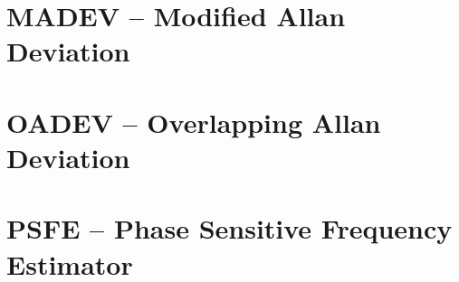 \documentclass[12pt,a4paper,oneside]{report} %
\begin{document}
\section*{\infosection} %

\section*{\examplesection} %


\chapter{MADEV -- Modified Allan Deviation} %
\section*{\infosection} %

\section*{\examplesection} %


\chapter{OADEV -- Overlapping Allan Deviation} %
\section*{\infosection} %

\section*{\examplesection} %


\chapter{PSFE -- Phase Sensitive Frequency Estimator} %
\end{document}
